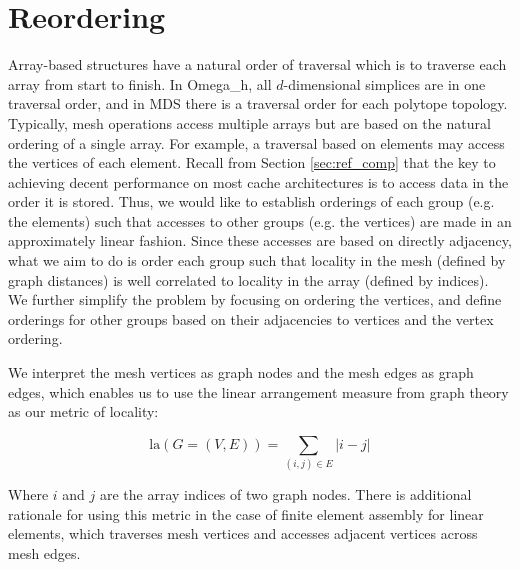 \section{Reordering}
\label{sec:reorder}

Array-based structures have a natural order of traversal which is to
traverse each array from start to finish.
In Omega\_h, all $d$-dimensional simplices are in one traversal order,
and in MDS there is a traversal order for each polytope topology.
Typically, mesh operations access multiple arrays but are based on
the natural ordering of a single array.
For example, a traversal based on elements may access the vertices
of each element.
Recall from Section \ref{sec:ref_comp} that the key to achieving decent
performance on most cache architectures is to access data in the order
it is stored.
Thus, we would like to establish orderings of each group (e.g. the elements)
such that accesses to other groups (e.g. the vertices) are made
in an approximately linear fashion.
Since these accesses are based on directly adjacency, what we aim to do
is order each group such that locality in the mesh (defined by graph distances)
is well correlated to locality in the array (defined by indices).
We further simplify the problem by focusing on ordering the vertices,
and define orderings for other groups based on their adjacencies to
vertices and the vertex ordering.

We interpret the mesh vertices as graph nodes and the mesh edges
as graph edges, which enables us to use the linear arrangement
measure from graph theory as our metric of locality:

\begin{equation}\label{eq:la}
\text{la}(G=(V,E)) = \sum_{(i,j)\in E} |i-j|
\end{equation}

Where $i$ and $j$ are the array indices of two graph nodes.
There is additional rationale for using this metric in the case
of finite element assembly for linear elements, which traverses
mesh vertices and accesses adjacent vertices across mesh edges.

